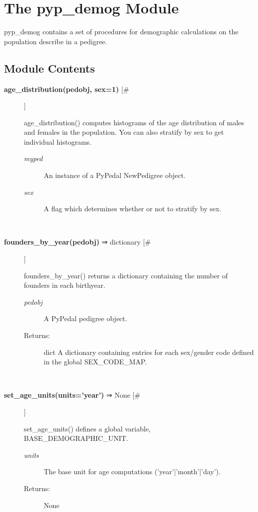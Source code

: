 \documentclass{article}
\begin{document}
\section*{The pyp\_demog Module}
\par pyp\_demog contains a set of procedures for demographic calculations on the
population describe in a pedigree.
\subsection*{Module Contents}
\begin{description}
\item[\textbf{age\_distribution(pedobj, sex=1)} [\#]
]
\par age\_distribution() computes histograms of the age distribution of
males and females in the population.  You can also stratify by
sex to get individual histograms.
\begin{description}
\item[\textit{myped}
]
An instance of a PyPedal NewPedigree object.
\item[\textit{sex}
]
A flag which determines whether or not to stratify by sex.
\end{description}\\

\item[\textbf{founders\_by\_year(pedobj)} ⇒ dictionary [\#]
]
\par founders\_by\_year() returns a dictionary containing the number of founders in each
birthyear.
\begin{description}
\item[\textit{pedobj}
]
A PyPedal pedigree object.
\item[Returns:
]
dict A dictionary containing entries for each sex/gender code defined in the global SEX\_CODE\_MAP.
\end{description}\\

\item[\textbf{set\_age\_units(units='year')} ⇒ None [\#]
]
\par set\_age\_units() defines a global variable, BASE\_DEMOGRAPHIC\_UNIT.
\begin{description}
\item[\textit{units}
]
The base unit for age computations ('year'|'month'|'day').
\item[Returns:
]
None
\end{description}\\


\end{description}
\end{document}

